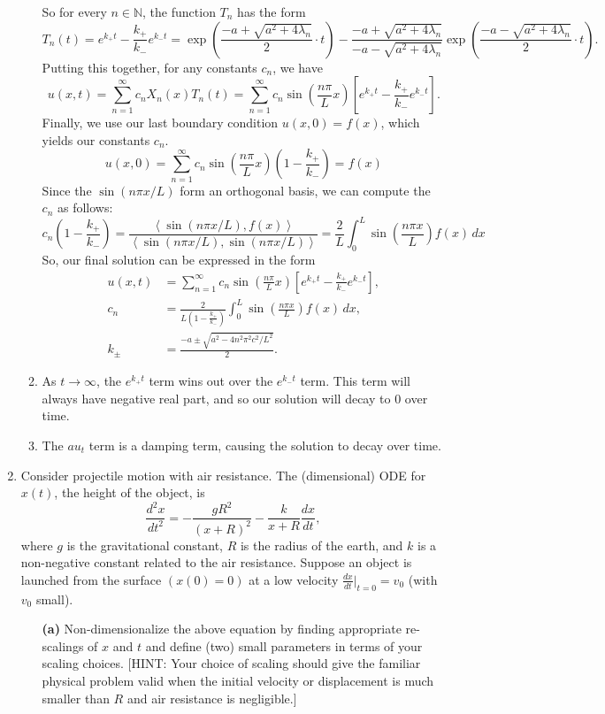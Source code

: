 \documentclass[10pt,letterpaper]{report}
\newcommand{\N}{\mathbb{N}}
\newcommand{\ip}[2]{\left\langle{#1},{#2}\right\rangle}
\begin{document}
\begin{enumerate}
\begin{enumerate}
    So for every $n \in \N$, the function $T_n$ has the form
    \[
    T_n(t) = e^{k_{+} t} - \frac{k_+}{k_-}e^{k_- t} = \exp\left(\frac{-a + \sqrt{a^2 + 4\lambda_n}}{2}\cdot t\right) - \frac{-a + \sqrt{a^2 + 4\lambda_n}}{-a - \sqrt{a^2 + 4\lambda_n}} \exp\left(\frac{-a - \sqrt{a^2 + 4\lambda_n}}{2}\cdot t\right).
    \]
    Putting this together, for any constants $c_n$, we have
    \[
    u(x, t) = \sum_{n = 1}^\infty c_nX_n(x)T_n(t) = \sum_{n = 1}^\infty c_n\sin\left(\frac{n\pi}{L}x\right)\left[e^{k_{+} t} - \frac{k_+}{k_-}e^{k_- t}\right].
    \]
    Finally, we use our last boundary condition $u(x, 0) = f(x)$, which yields our constants $c_n$.
    \[
    u(x, 0) = \sum_{n = 1}^\infty c_n\sin\left(\frac{n\pi}{L}x\right)\left(1 - \frac{k_+}{k_-}\right) = f(x)
    \]
    Since the $\sin(n\pi x/ L)$ form an orthogonal basis, we can compute the $c_n$ as follows:
    \[
    c_n\left(1 - \frac{k_+}{k_-}\right) = \frac{\ip{\sin(n\pi x/L)}{f(x)}}{\ip{\sin(n\pi x/L)}{\sin(n\pi x/L)}} = \frac{2}{L}\int_0^L \sin\left(\frac{n\pi x}{L}\right)f(x)\,dx
    \]
    So, our final solution can be expressed in the form
    \begin{align*}
    u(x, t) &= \sum_{n = 1}^\infty c_n\sin\left(\frac{n\pi}{L}x\right)\left[e^{k_{+} t} - \frac{k_+}{k_-}e^{k_- t}\right],
    \\
    c_n &= \frac{2}{L\left(1 - \frac{k_+}{k_-}\right)}\int_0^L \sin\left(\frac{n\pi x}{L}\right)f(x)\,dx,
    \\
    k_\pm &= \frac{-a \pm \sqrt{a^2 - 4n^2\pi^2c^2/L^2}}{2}.
    \end{align*}
    
    \item As $t \to \infty$, the $e^{k_+t}$ term wins out over the $e^{k_-t}$ term. This term will always have negative real part, and so our solution will decay to 0 over time.
    
    \item The $au_t$ term is a damping term, causing the solution to decay over time.
\end{enumerate}

\item \begin{qbox}
Consider projectile motion with air resistance. The (dimensional) ODE for $x(t)$, the
height of the object, is
\[
\frac{d^2x}{dt^2} = -\frac{gR^2}{(x + R)^2} - \frac{k}{x + R}\frac{dx}{dt},
\]
where $g$ is the gravitational constant, $R$ is the radius of the earth, and $k$ is a non-negative constant related to the air resistance. Suppose an object is launched from the surface $(x(0) = 0)$ at a low velocity $\frac{dx}{dt}\vert_{t = 0} = v_0$ (with $v_0$ small).
\begin{itemize}
    \item[\textbf{(a)}] Non-dimensionalize the above equation by finding appropriate re-scalings of $x$ and $t$ and define (two) small parameters in terms of your scaling choices. [HINT: Your choice of scaling should give the familiar physical problem valid when the initial velocity or displacement is much smaller than $R$ and air resistance is negligible.]
    

\end{itemize}
\end{qbox}
\end{enumerate}
\end{document}
